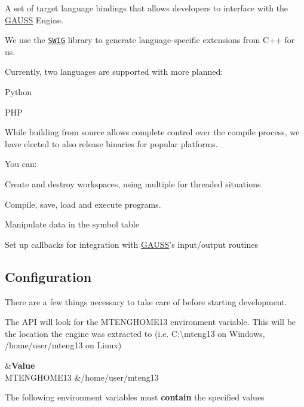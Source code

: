 A set of target language bindings that allows developers to interface with the \hyperlink{class_g_a_u_s_s}{G\-A\-U\-S\-S} Engine.

We use the \href{http://www.swig.org}{\tt S\-W\-I\-G} library to generate language-\/specific extensions from C++ for us.

Currently, two languages are supported with more planned\-:


\begin{DoxyItemize}
\item Python
\item P\-H\-P
\end{DoxyItemize}

While building from source allows complete control over the compile process, we have elected to also release binaries for popular platforms.

You can\-:
\begin{DoxyItemize}
\item Create and destroy workspaces, using multiple for threaded situations
\item Compile, save, load and execute programs.
\item Manipulate data in the symbol table
\item Set up callbacks for integration with \hyperlink{class_g_a_u_s_s}{G\-A\-U\-S\-S}'s input/output routines
\end{DoxyItemize}

\subsection*{Configuration}

There are a few things necessary to take care of before starting development.

The A\-P\-I will look for the {\ttfamily M\-T\-E\-N\-G\-H\-O\-M\-E13} environment variable. This will be the location the engine was extracted to (i.\-e. {\ttfamily C\-:\textbackslash{}mteng13} on Windows, {\ttfamily /home/user/mteng13} on Linux)

\begin{TabularC}{2}
\hline
{}&{\bf Value}\\
{\ttfamily M\-T\-E\-N\-G\-H\-O\-M\-E13} &{\ttfamily /home/user/mteng13} \\
\end{TabularC}


The following environment variables must {\bfseries contain} the specified values

